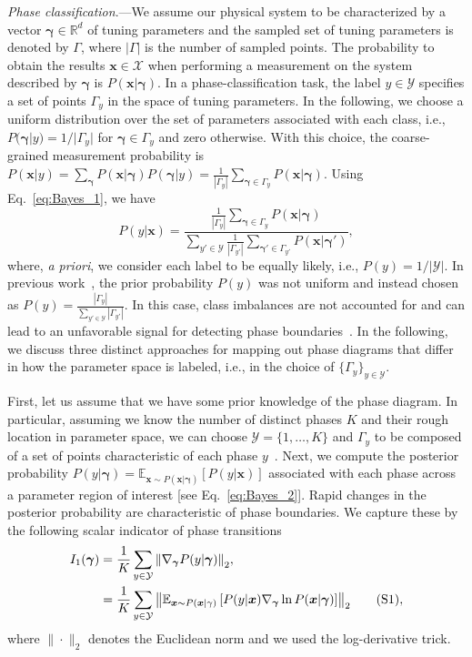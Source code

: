 \documentclass[twocolumn,aps,prl,superscriptaddress,tightlines,nofootinbib]{revtex4-2}
\newcommand\numberthis{\addtocounter{equation}{1}\tag{\theequation}}
\begin{document}
\indent \emph{Phase classification}.---We assume our physical system to be characterized by a vector $\bm{\gamma}\in \mathbb{R}^{d}$ of tuning parameters and the sampled set of tuning parameters is denoted by $\Gamma$, where $|\Gamma|$ is the number of sampled points. The probability to obtain the results $\bm{x}\in \mathcal{X}$ when performing a measurement on the system described by $\bm{\gamma}$ is $P(\bm{x}|\bm{\gamma})$. In a phase-classification task, the label $y\in \mathcal{Y}$ specifies a set of points $\Gamma_{y}$ in the space of tuning parameters. In the following, we choose a uniform distribution over the set of parameters associated with each class, i.e., $P(\bm{\gamma}|y) = 1 / |\Gamma_{y}|$ for $\bm{\gamma}\in \Gamma_{y}$ and zero otherwise. With this choice, the coarse-grained measurement probability is $P(\bm{x}|y) = \sum_{\bm{\gamma}} P(\bm{x}|\bm{\gamma}) P(\bm{\gamma}|y) = \frac{1}{|\Gamma_{y}|}\sum_{\bm{\gamma} \in \Gamma_{y}} P(\bm{x}|\bm{\gamma})$. Using Eq.~\eqref{eq:Bayes_1}, we have
\begin{equation}\label{eq:Bayes_2}
    P(y|\bm{x}) =  \frac{\frac{1}{|\Gamma_{y}|}\sum_{\bm{\gamma} \in \Gamma_{y}} P(\bm{x}|\bm{\gamma})}{\sum_{y' \in \mathcal{Y}}\frac{1}{|\Gamma_{y'}|}\sum_{\bm{\gamma}' \in \Gamma_{y'}} P(\bm{x}|\bm{\gamma}')},
\end{equation}
where, \emph{a priori}, we consider each label to be equally likely, i.e., $P(y)=1/|\mathcal{Y}|$. In previous work~\cite{van:2017}, the prior probability $P(y)$ was not uniform and instead 
chosen as $P(y)=\frac{|\Gamma_{y}|}{\sum_{y' \in \mathcal{Y}}|\Gamma_{y'}|}$. In this case, class imbalances are not accounted for and can lead to an unfavorable signal for detecting phase boundaries~\cite{suppl}. In the following, we discuss three distinct approaches for mapping out phase diagrams that differ in how the parameter space is labeled, i.e., in the choice of $\{ \Gamma_{y}\}_{y \in \mathcal{Y}}$.

First, let us assume that we have some prior knowledge of the phase diagram. In particular, assuming we know the number of distinct phases $K$ and their rough location in parameter space, we can choose $\mathcal{Y} = \{1,\dots,K \}$ and $\Gamma_{y}$ to be composed of a set of points characteristic of each phase $y$~\cite{carrasquilla:2017}. Next, we compute the posterior probability $P(y|\bm{\gamma}) = \mathbb{E}_{\bm{x} \sim P(\bm{x}|\bm{\gamma})}\left[ P(y|\bm{x}) \right]$ associated with each phase across a parameter region of interest [see Eq.~\eqref{eq:Bayes_2}]. Rapid changes in the posterior probability are characteristic of phase boundaries. We capture these by the following scalar indicator of phase transitions
\begin{align*}\label{eq:ISL}
    I_{1}(\bm{\gamma}) &= \frac{1}{K} \sum_{y \in \mathcal{Y}} \norm{\nabla_{\bm{\gamma}} P(y|\bm{\gamma}) }_{2},\\
    &= \frac{1}{K}\sum_{y \in \mathcal{Y}} \norm{\mathbb{E}_{\bm{x} \sim P(\bm{x}|\gamma)}\left[P(y|\bm{x}) \nabla_{\bm{\gamma}} \ln P(\bm{x}|\bm{\gamma})\right]}_{2} \numberthis,
\end{align*}
where $\| \cdot \|_{2}$ denotes the Euclidean norm and we used the log-derivative trick.
\end{document}
